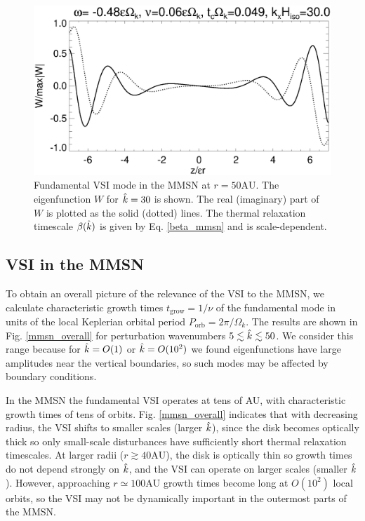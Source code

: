\begin{figure}
   \includegraphics[width=\linewidth,clip=true,trim=0cm 0.0cm 0cm
  0cm]{figures/eigenvectorW_mmsnkx30.ps}
  \caption{Fundamental VSI mode in the MMSN at 
    $r=50\mathrm{AU}$. The eigenfunction $W$ for $\hat{k}=30$ is shown. The real (imaginary)
    part of $W$ is plotted as the solid (dotted)
    lines. The thermal relaxation timescale $\beta(\hat{k})$ is given by
    Eq. \ref{beta_mmsn} and is scale-dependent. \label{mmsn_eigenW}}    
\end{figure}

\subsection{VSI in the MMSN}
To obtain an overall picture of the relevance of the VSI to the MMSN,
we calculate characteristic growth times $t_\mathrm{grow} = 1/\nu$ of 
the fundamental mode in units of the local Keplerian orbital period
$P_\mathrm{orb}= 2\pi/\Omega_k$. The results are shown in 
Fig. \ref{mmsn_overall} for perturbation wavenumbers $5\lesssim
\hat{k}\lesssim 50$. We consider this range because for  
$\hat{k}=O(1)$ or $\hat{k}=O(10^2)$ we found eigenfunctions have large
amplitudes near the vertical boundaries, so such modes may be affected
by boundary conditions. 

In the MMSN the fundamental VSI operates at tens of AU, with
characteristic growth times of tens of orbits. %
Fig. \ref{mmsn_overall} indicates that with decreasing radius, the VSI
shifts to smaller scales (larger $\hat{k}$), since the disk becomes optically
thick so only small-scale disturbances have sufficiently short thermal
relaxation timescales. At larger radii ($r\gtrsim 
40\mathrm{AU}$), the disk is optically thin so growth times do not depend strongly on   
$\hat{k}$, and the VSI can operate on larger scales (smaller $\hat{k}$).  
However, approaching 
$r\simeq 100\mathrm{AU}$ growth times become long at $O(10^2)$ local orbits,
so the VSI may not be dynamically important in the outermost parts of
the MMSN. 

